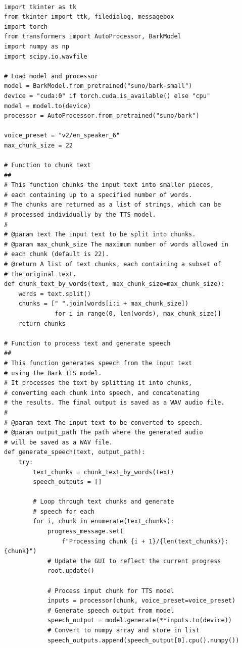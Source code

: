 \documentclass[12pt, a4paper]{article}
\begin{document}
\begin{verbatim}

import tkinter as tk
from tkinter import ttk, filedialog, messagebox
import torch
from transformers import AutoProcessor, BarkModel
import numpy as np
import scipy.io.wavfile

# Load model and processor
model = BarkModel.from_pretrained("suno/bark-small")
device = "cuda:0" if torch.cuda.is_available() else "cpu"
model = model.to(device)
processor = AutoProcessor.from_pretrained("suno/bark")

voice_preset = "v2/en_speaker_6"
max_chunk_size = 22

# Function to chunk text
##
# This function chunks the input text into smaller pieces, 
# each containing up to a specified number of words.
# The chunks are returned as a list of strings, which can be 
# processed individually by the TTS model.
#
# @param text The input text to be split into chunks.
# @param max_chunk_size The maximum number of words allowed in 
# each chunk (default is 22).
# @return A list of text chunks, each containing a subset of 
# the original text.
def chunk_text_by_words(text, max_chunk_size=max_chunk_size):
    words = text.split()
    chunks = [" ".join(words[i:i + max_chunk_size]) 
              for i in range(0, len(words), max_chunk_size)]
    return chunks

# Function to process text and generate speech
##
# This function generates speech from the input text 
# using the Bark TTS model.
# It processes the text by splitting it into chunks, 
# converting each chunk into speech, and concatenating 
# the results. The final output is saved as a WAV audio file.
#
# @param text The input text to be converted to speech.
# @param output_path The path where the generated audio 
# will be saved as a WAV file.
def generate_speech(text, output_path):
    try:
        text_chunks = chunk_text_by_words(text)
        speech_outputs = []

        # Loop through text chunks and generate 
        # speech for each
        for i, chunk in enumerate(text_chunks):
            progress_message.set(
                f"Processing chunk {i + 1}/{len(text_chunks)}: {chunk}")
            # Update the GUI to reflect the current progress
            root.update()  

            # Process input chunk for TTS model
            inputs = processor(chunk, voice_preset=voice_preset)
            # Generate speech output from model
            speech_output = model.generate(**inputs.to(device)) 
            # Convert to numpy array and store in list
            speech_outputs.append(speech_output[0].cpu().numpy()) 


\end{verbatim}
\end{document}
